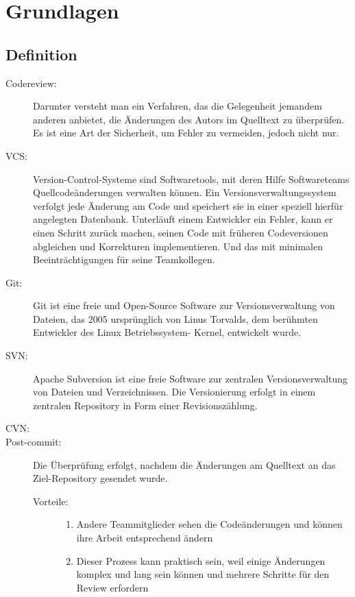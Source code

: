 \section{Grundlagen}
\label{sec:Grundlagen}

\subsection{Definition}
\label{subsec:Definition}

\begin{description}
	\item [Codereview:]
		Darunter versteht man ein Verfahren, das die Gelegenheit jemandem anderen anbietet, die Änderungen des Autors im Quelltext zu überprüfen. Es ist eine Art der Sicherheit, um 				Fehler zu vermeiden, jedoch nicht nur. 

	\item [VCS:]
		Version-Control-Systeme sind Softwaretools, mit deren Hilfe Softwareteams Quellcodeänderungen verwalten können. Ein Versionsverwaltungssystem verfolgt jede Änderung am Code und 			speichert sie in einer speziell hierfür angelegten Datenbank. Unterläuft einem Entwickler ein Fehler, kann er einen Schritt zurück machen, seinen Code mit früheren Codeversionen 		abgleichen und Korrekturen implementieren. Und das mit minimalen Beeinträchtigungen für seine Teamkollegen.\cite{Bitbucket}

	\item [Git:]
		Git ist eine freie und Open-Source Software zur Versionsverwaltung von Dateien, das 2005 ursprünglich von Linus Torvalds, dem berühmten Entwickler des Linux Betriebssystem-				Kernel, entwickelt wurde.
	
	\item [SVN:]
		Apache Subversion ist eine freie Software zur zentralen Versionsverwaltung von Dateien und Verzeichnissen. Die Versionierung erfolgt in einem zentralen Repository in Form einer  			Revisionszählung.
	
	\item [CVN:]
	
	\item [Post-commit:]
		Die Überprüfung erfolgt, nachdem die Änderungen am Quelltext an das Ziel-Repository gesendet wurde.
		\begin{description}
			\item [Vorteile:] \hfill
			\begin{enumerate}
				\item Andere Teammitglieder sehen die Codeänderungen und können ihre Arbeit entsprechend ändern
				\item Dieser Prozess kann praktisch sein, weil einige Änderungen komplex und lang sein können und mehrere Schritte für den Review erfordern
			\end{enumerate}
			

\end{description}
\end{description}
